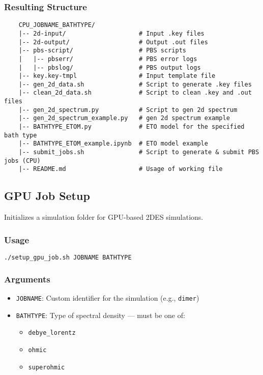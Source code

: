 \documentclass{article}
\begin{document}
\subsubsection*{Resulting Structure}
\begin{verbatim}
    CPU_JOBNAME_BATHTYPE/
    |-- 2d-input/                    # Input .key files
    |-- 2d-output/                   # Output .out files
    |-- pbs-script/                  # PBS scripts
    |   |-- pbserr/                  # PBS error logs
    |   |-- pbslog/                  # PBS output logs
    |-- key.key-tmpl                 # Input template file
    |-- gen_2d_data.sh               # Script to generate .key files
    |-- clean_2d_data.sh             # Script to clean .key and .out files
    |-- gen_2d_spectrum.py           # Script to gen 2d spectrum
    |-- gen_2d_spectrum_example.py   # gen 2d spectrum example
    |-- BATHTYPE_ETOM.py             # ETO model for the specified bath type
    |-- BATHTYPE_ETOM_example.ipynb  # ETO model example
    |-- submit_jobs.sh               # Script to generate & submit PBS jobs (CPU)
    |-- README.md                    # Usage of working file
\end{verbatim}

\subsection{GPU Job Setup}

Initializes a simulation folder for GPU-based 2DES simulations.

\subsubsection*{Usage}
\begin{lstlisting}[language=bash]
./setup_gpu_job.sh JOBNAME BATHTYPE
\end{lstlisting}

\subsubsection*{Arguments}
\begin{itemize}
    \item \texttt{JOBNAME}: Custom identifier for the simulation (e.g., \texttt{dimer})
    \item \texttt{BATHTYPE}: Type of spectral density — must be one of:
    \begin{itemize}
        \item \texttt{debye\_lorentz}
        \item \texttt{ohmic}
        \item \texttt{superohmic}
    \end{itemize}
\end{itemize}
\end{document}
